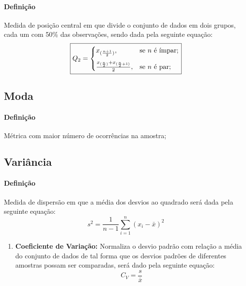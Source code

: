 \documentclass{article}
\begin{document}
            \paragraph{Definição}Medida de posição central em que divide o conjunto de dados em dois grupos, cada um com 50\% das observações, sendo dada pela seguinte equação:
                \begin{equation}
                    \boxed{
                        Q_{2} =
                        \begin{cases}
                            x_{(\frac{n+1}{2})},  & \text{se $n$ é ímpar};\vspace{2.5mm}\\
                            \frac{x_{(\frac{n}{2})} + x_{(\frac{n}{2} + 1)}}{2},  & \text{se $n$ é par};\\
                        \end{cases}
                    }
                \end{equation}

        \subsection{Moda}
            \paragraph{Definição}Métrica com maior número de ocorrências na amostra;

        \subsection{Variância}
            \paragraph{Definição}Medida de dispersão em que a média dos desvios ao quadrado será dada pela seguinte equação:
                \begin{equation}
                    \boxed{
                        s^{2} = \frac{1}{n-1} \sum_{i=1}^{n} (x_{i} - \bar{x})^{2}
                    }
                \end{equation}
                \begin{enumerate}[rightmargin=\leftmargin, noitemsep]
                    \item \textbf{Coeficiente de Variação:} Normaliza o desvio padrão com relação a média do conjunto de dados de tal forma que os desvios padrões de diferentes amostras possam ser comparadas, será dado pela seguinte equação:
                        \begin{equation}
                            \boxed{
                                C_{V} = \frac{s}{\bar{x}}
                            }
                        \end{equation}
                \end{enumerate}
\end{document}
